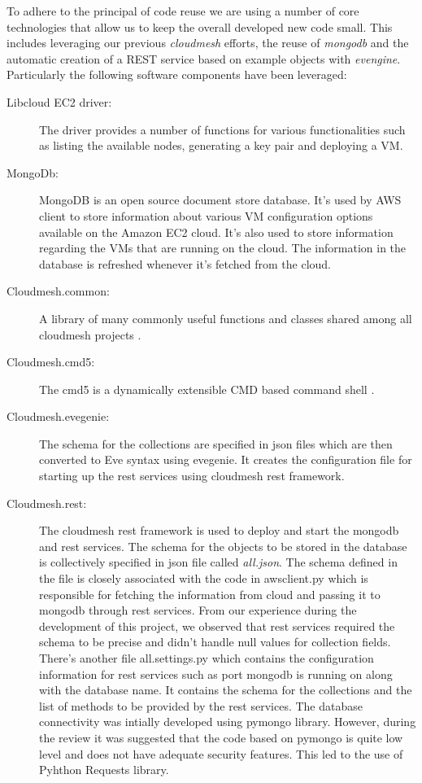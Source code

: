 \documentclass[9pt,twocolumn,twoside]{../../styles/osajnl}
\begin{document}
To adhere to the principal of code reuse we are using a number of core
technologies that allow us to keep the overall developed new code
small. This includes leveraging our previous {\it cloudmesh} efforts, the
reuse of {\it mongodb} and the automatic creation of a REST service based
on example objects with {\it evengine}. Particularly the following
software components have been leveraged:

\begin{description}

\item [Libcloud EC2 driver:] The driver provides a number of functions
  for various functionalities such as listing the available nodes,
  generating a key pair and deploying a VM.

\item [MongoDb:] MongoDB is an open source document store database. It's
  used by AWS client to store information about various VM
  configuration options available on the Amazon EC2 cloud. It's also
  used to store information regarding the VMs that are running on the
  cloud. The information in the database is refreshed whenever it's
  fetched from the cloud.

\item [Cloudmesh.common:] A library of many commonly useful functions
  and classes shared among all cloudmesh projects \cite{www-cloudmesh-common}.

\item [Cloudmesh.cmd5:] The cmd5 is a dynamically extensible CMD based
  command shell \cite{www-cloudmesh-cmd5}.

\item [Cloudmesh.evegenie:] The schema for the collections are specified
  in json files which are then converted to Eve syntax using
  evegenie. It creates the configuration file for starting up the rest
  services using cloudmesh rest framework.
	 	
\item [Cloudmesh.rest:] The cloudmesh rest framework is used to deploy
  and start the mongodb and rest services. The schema for the objects
  to be stored in the database is collectively specified in json file
  called {\it all.json}. The schema defined in the file is closely
  associated with the code in awsclient.py which is responsible for
  fetching the information from cloud and passing it to mongodb
  through rest services. From our experience during the development of
  this project, we observed that rest services required the schema to
  be precise and didn't handle null values for collection
  fields. There's another file all.settings.py which contains the
  configuration information for rest services such as port mongodb is
  running on along with the database name. It contains the schema for
  the collections and the list of methods to be provided by the rest
  services. The database connectivity was intially developed using
  pymongo library. However, during the review it was suggested that
  the code based on pymongo is quite low level and does not have
  adequate security features. This led to the use of Pyhthon Requests
  library.
	
\end{description}
\end{document}
